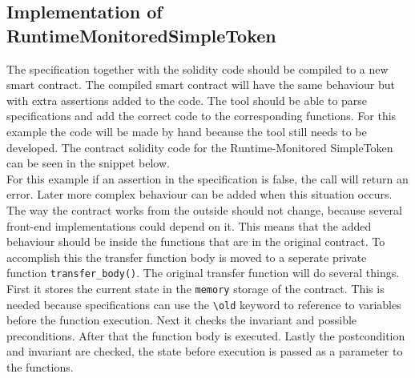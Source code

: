 \documentclass[a4paper]{article}
\begin{document}
\subsection{Implementation of RuntimeMonitoredSimpleToken}
The specification together with the solidity code should be compiled to a new smart contract. The compiled smart contract will have the same behaviour but with extra assertions added to the code. The tool should be able to parse specifications and add the correct code to the corresponding functions. For this example the code will be made by hand because the tool still needs to be developed. The contract solidity code for the Runtime-Monitored SimpleToken can be seen in the snippet below.\\
For this example if an assertion in the specification is false, the call will return an error. Later more complex behaviour can be added when this situation occurs. The way the contract works from the outside should not change, because several front-end implementations could depend on it. This means that the added behaviour should be inside the functions that are in the original contract. To accomplish this the transfer function body is moved to a seperate private function \texttt{transfer\_body()}. The original transfer function will do several things. First it stores the current state in the \texttt{memory} storage of the contract. This is needed because specifications can use the \texttt{\textbackslash old} keyword to reference to variables before the function execution. Next it checks the invariant and possible preconditions. After that the function body is executed. Lastly the postcondition and invariant are checked, the state before execution is passed as a parameter to the functions. 


\end{document}
